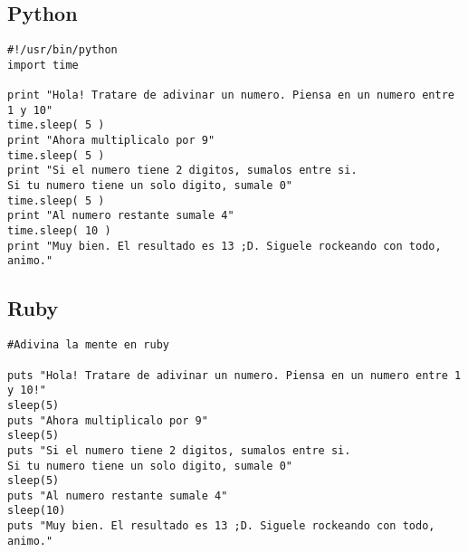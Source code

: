 \documentclass[notitlepage,12pt]{article}
\begin{document}
\subsection{Python}
\begin{verbatim}
#!/usr/bin/python
import time
     
print "Hola! Tratare de adivinar un numero. Piensa en un numero entre 1 y 10"
time.sleep( 5 )
print "Ahora multiplicalo por 9"
time.sleep( 5 )
print "Si el numero tiene 2 digitos, sumalos entre si. 
Si tu numero tiene un solo digito, sumale 0"
time.sleep( 5 )
print "Al numero restante sumale 4"
time.sleep( 10 )
print "Muy bien. El resultado es 13 ;D. Siguele rockeando con todo, animo."
\end{verbatim}
\subsection{Ruby}
\begin{verbatim}
#Adivina la mente en ruby

puts "Hola! Tratare de adivinar un numero. Piensa en un numero entre 1 y 10!"
sleep(5)
puts "Ahora multiplicalo por 9"
sleep(5)
puts "Si el numero tiene 2 digitos, sumalos entre si.
Si tu numero tiene un solo digito, sumale 0"
sleep(5)
puts "Al numero restante sumale 4"
sleep(10)
puts "Muy bien. El resultado es 13 ;D. Siguele rockeando con todo, animo."
\end{verbatim}
\end{document}
